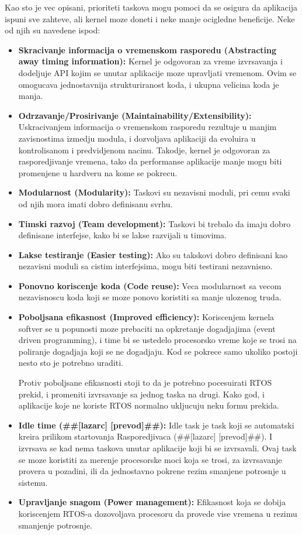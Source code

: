 \documentclass[a4paper,12pt, master]{etf}
\begin{document}
	Kao sto je vec opisani, prioriteti taskova mogu pomoci da se osigura da aplikacija ispuni sve
	zahteve, ali kernel moze doneti i neke manje ocigledne beneficije. Neke od njih su navedene
	ispod:
	\begin{itemize}
		\item \textbf{Skracivanje informacija o vremenskom rasporedu (Abstracting away timing information):}
		Kernel je odgovoran za vreme izvrsavanja i dodeljuje API kojim se unutar aplikacije moze
		upravljati vremenom. Ovim se omogucava jednostavnija strukturiranost koda, i ukupna
		velicina koda je manja.
		\item \textbf{Odrzavanje/Prosirivanje (Maintainability/Extensibility):}
		Uskracivanjem informacija o vremenskom rasporedu rezultuje u manjim zavisnostima izmedju
		modula, i dozvoljava aplikaciji da evoluira u kontrolisanom i predvidjenom nacinu. Takodje,
		kernel je odgovoran za rasporedjivanje vremena, tako da performanse aplikacije manje mogu
		biti promenjene u hardveru na kome se pokrecu.
		\item \textbf{Modularnost (Modularity):}
		Taskovi su nezavisni moduli, pri cemu svaki od njih mora imati dobro definisanu svrhu.
		\item \textbf{Timski razvoj (Team development):}
		Taskovi bi trebalo da imaju dobro definisane interfejse, kako bi se lakse razvijali u
		timovima.
		\item \textbf{Lakse testiranje (Easier testing):}
		Ako su takskovi dobro definisani kao nezavisni moduli sa cistim interfejsima, mogu biti
		testirani nezavnisno.
		\item \textbf{Ponovno koriscenje koda (Code reuse):}
		Veca modularnost sa vecom nezavisnoscu koda koji se moze ponovo koristiti sa manje ulozenog
		truda.
		\item \textbf{Poboljsana efikasnost (Improved efficiency):}
		Koriscenjem kernela softver se u popunosti moze prebaciti na opkretanje dogadjajima (event
		driven programming), i time bi se ustedelo procesorsko vreme koje se trosi na poliranje
		dogadjaja koji se ne dogadjaju. Kod se pokrece samo ukoliko postoji nesto sto je potrebno
		uraditi.

		Protiv poboljsane efikasnosti stoji to da je potrebno pocesuirati RTOS prekid, i promeniti
		izvrsavanje sa jednog taska na drugi. Kako god, i aplikacije koje ne koriste RTOS normalno
		ukljucuju neku formu prekida.
		\item \textbf{Idle time (\#\#[lazarc] [prevod]\#\#):}
		Idle task je task koji se automatski kreira prilikom startovanja Rasporedjivaca
		(\#\#[lazarc] [prevod]\#\#). I izvrsava se kad nema taskova unutar aplikacije koji bi se
		izvrsavali. Ovaj task se moze koristiti za merenje procesorske moci koja se trosi, za
		izvrsavanje provera u pozadini, ili da jednostavno pokrene rezim smanjene potrosnje u
		sistemu.
		\item \textbf{Upravljanje snagom (Power management):}
		Efikasnost koja se dobija koriscenjem RTOS-a dozovoljava procesoru da provede vise vremena
		u rezimu smanjenje potrosnje.


\end{itemize}
\end{document}
